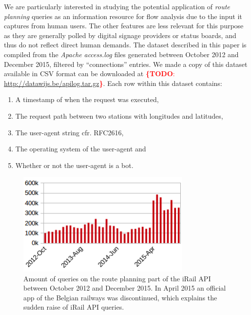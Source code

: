 \documentclass{sig-alternate}
\newcommand{\todo}[1]{\noindent\textcolor{red}{{\bf \{TODO}: #1{\bf \}}}}
\begin{document}
We are particularly interested in studying the potential application of \emph{route planning} queries as an information resource for flow analysis due to the input it captures from human users.
The other features are less relevant for this purpose as they are generally polled by digital signage providers or status boards, and thus do not reflect direct human demands.
The dataset described in this paper is compiled from the \emph{Apache} \emph{access.log} files generated between October 2012 and December 2015, filtered by ``connections'' entries.
We made a copy of this dataset available in CSV format can be downloaded at \todo{\url{http://datawijs.be/apilog.tar.gz}}.
Each row within this dataset contains:
\begin{enumerate}
\item A timestamp of when the request was executed,
\item The request path between two stations with longitudes and latitudes,
\item The user-agent string cfr. RFC2616,
\item The operating system of the user-agent and
\item Whether or not the user-agent is a bot.
\end{enumerate}

\begin{figure}
\centering
\includegraphics[width=8.6cm]{querylogs}
\caption{Amount of queries on the route planning part of the iRail API between October 2012 and December 2015. In April 2015 an official app of the Belgian railways was discontinued, which explains the sudden raise of iRail API queries.}
\label{fig:querylogs}
\end{figure}
\end{document}
